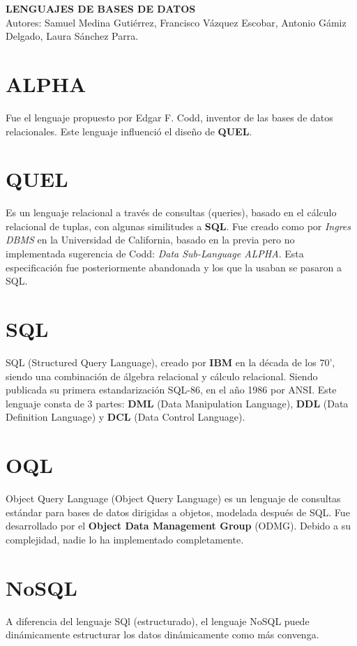 \documentclass[a4paper, twoside, 11pt]{report}
\begin{document}
\begin{center}
\large \textbf{LENGUAJES DE BASES DE DATOS \\ }
\scriptsize Autores: Samuel Medina Gutiérrez, Francisco Vázquez Escobar, Antonio Gámiz Delgado, Laura Sánchez Parra.
\end{center}

\section*{ \large ALPHA}
Fue el lenguaje propuesto por Edgar F. Codd, inventor de las bases de datos relacionales. Este lenguaje influenció el diseño de \textbf{QUEL}. 
\section*{\large QUEL}
Es un lenguaje relacional a través de consultas (queries), basado en el cálculo relacional de tuplas, con algunas similitudes a \textbf{SQL}. Fue creado como por \textit{Ingres DBMS} en la Universidad de California, basado en la previa pero no implementada sugerencia de Codd: \textit{Data Sub-Language ALPHA}. Esta especificación fue posteriormente abandonada y los que la usaban se pasaron a SQL. 
\section*{\large SQL}
SQL (Structured Query Language), creado por \textbf{IBM} en la década de los 70', siendo una combinación de álgebra relacional y cálculo relacional. Siendo publicada su primera estandarización SQL-86, en el año 1986 por ANSI. Este lenguaje consta de 3 partes: \textbf{DML} (Data Manipulation Language), \textbf{DDL} (Data Definition Language) y \textbf{DCL} (Data Control Language).
\section*{\large OQL}
Object Query Language (Object Query Language) es un lenguaje de consultas estándar para bases de datos dirigidas a objetos, modelada después de SQL. Fue desarrollado por el \textbf{Object Data Management Group} (ODMG). Debido a su complejidad, nadie lo ha implementado completamente.
\section*{\large NoSQL}
A diferencia del lenguaje SQl (estructurado), el lenguaje NoSQL puede dinámicamente estructurar los datos dinámicamente como más convenga.
\end{document}
